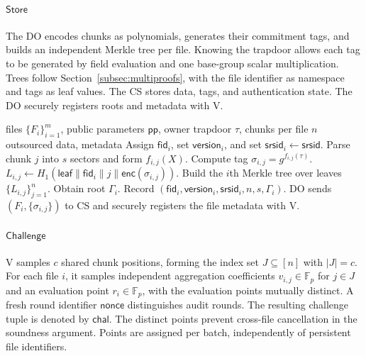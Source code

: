 \documentclass[lettersize,journal]{IEEEtran}
\newcommand{\FF}{\mathbb{F}}
\newcommand{\Store}{\ensuremath{\mathsf{Store}}}
\newcommand{\Chal}{\ensuremath{\mathsf{Challenge}}}
\begin{document}
\paragraph{\textbf{\Store{}}}
The DO encodes chunks as polynomials, generates their commitment tags, and builds an independent Merkle tree per file. Knowing the trapdoor allows each tag to be generated by field evaluation and one base-group scalar multiplication. Trees follow Section~\ref{subsec:multiproofs}, with the file identifier as namespace and tags as leaf values. The CS stores data, tags, and authentication state. The DO securely registers roots and metadata with V.

\begin{algorithm}[h]
\caption{$\Store$}
\label{alg:store}
\begin{algorithmic}[1]
\Require files $\{F_i\}_{i=1}^m$, public parameters $\mathsf{pp}$, owner trapdoor $\tau$, chunks per file $n$
\Ensure outsourced data, metadata
  \State Assign $\mathsf{fid}_i$, set $\mathsf{version}_i$, and set $\mathsf{srsid}_i\gets\mathsf{srsid}$.
    \State Parse chunk $j$ into $s$ sectors and form $f_{i,j}(X)$.
    \State Compute tag $\sigma_{i,j}=g^{f_{i,j}(\tau)}$.
    \State $L_{i,j}\gets H_1(\mathsf{leaf}\|\mathsf{fid}_i\|j\|\mathsf{enc}(\sigma_{i,j}))$.
  \EndFor
  \State Build the $i$th Merkle tree over leaves $\{L_{i,j}\}_{j=1}^n$.
  \State Obtain root $\Gamma_i$.
  \State Record $(\mathsf{fid}_i,\mathsf{version}_i,\mathsf{srsid}_i,n,s,\Gamma_i)$.
\EndFor
\State DO sends $(F_i,\{\sigma_{i,j}\})$ to CS and securely registers the file metadata with V.
\end{algorithmic}
\end{algorithm}

\paragraph{\textbf{\Chal{}}}
V samples $c$ shared chunk positions, forming the index set $J\subseteq[n]$ with $|J|=c$. For each file $i$, it samples independent aggregation coefficients $v_{i,j}\in\FF_p$ for $j\in J$ and an evaluation point $r_i\in\FF_p$, with the evaluation points mutually distinct. A fresh round identifier $\mathsf{nonce}$ distinguishes audit rounds. The resulting challenge tuple is denoted by $\mathsf{chal}$. The distinct points prevent cross-file cancellation in the soundness argument. Points are assigned per batch, independently of persistent file identifiers.
\end{document}
